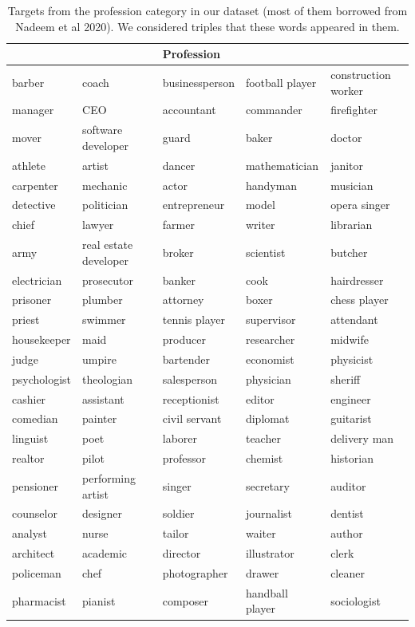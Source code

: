 \begin{table}[h!]
\begin{tabular}{ p{2.3cm} p{3.3cm} p{2.3cm} p{2.8cm} p{3.0cm} }
 \toprule
 &&Profession&&\\
 \midrule
barber& coach& businessperson& football player& construction worker \\ manager&
CEO& accountant& commander& firefighter \\ mover& software developer&
guard& baker& doctor \\ athlete& artist& dancer&
mathematician& janitor \\ carpenter& mechanic& actor& handyman&
musician \\ detective& politician& entrepreneur& model& opera singer \\
chief& lawyer& farmer& writer& librarian \\ army&
real estate developer& broker& scientist& butcher \\ electrician& prosecutor&
banker& cook& hairdresser \\ prisoner& plumber& attorney&
boxer& chess player \\ priest& swimmer& tennis player& supervisor&
attendant \\ housekeeper& maid& producer& researcher& midwife \\
judge& umpire& bartender& economist& physicist \\ psychologist&
theologian& salesperson& physician& sheriff \\ cashier& assistant&
receptionist& editor& engineer \\ comedian& painter& civil servant&
diplomat& guitarist \\ linguist& poet& laborer& teacher&
delivery man \\ realtor& pilot& professor& chemist& historian \\
pensioner& performing artist& singer& secretary& auditor \\ counselor&
designer& soldier& journalist& dentist \\ analyst& nurse&
tailor& waiter& author \\ architect& academic& director&
illustrator& clerk \\ policeman& chef& photographer& drawer&
cleaner \\ pharmacist& pianist& composer& handball player& sociologist  \\[0.5pt]
  \bottomrule
\end{tabular}
\caption{Targets from the profession category in our dataset (most of them borrowed from Nadeem et al 2020). We considered triples that these words appeared in them.}
    \label{stereoset_prof_conceptnet}
\end{table}

